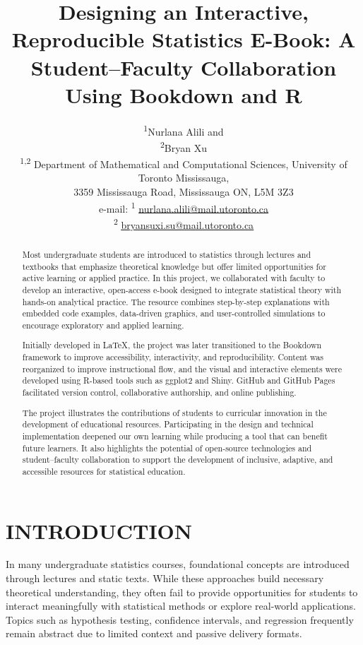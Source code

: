 \documentclass[11pt]{article}
\title{Designing an Interactive, Reproducible Statistics E-Book: A Student–Faculty Collaboration Using Bookdown and R}
\author{%
    \begin{tabular}{c}
        \textsuperscript{1}Nurlana Alili and\\
        \textsuperscript{2}Bryan Xu \\[6pt]
        \textsuperscript{1,2} Department of Mathematical and Computational Sciences, University of Toronto Mississauga, \\ 
        3359 Mississauga Road, Mississauga ON, L5M 3Z3\\[6pt]
        e-mail: \textsuperscript{1} \href{mailto:nurlana.alili@mail.utoronto.ca}{\uline{nurlana.alili@mail.utoronto.ca}}\\
        \textsuperscript{2} \href{mailto:bryansuxi.su@mail.utoronto.ca}{\uline{bryansuxi.su@mail.utoronto.ca}}
    \end{tabular}%
}
\date{}
\begin{document}
\maketitle

\begin{abstract}
Most undergraduate students are introduced to statistics through lectures and textbooks that emphasize theoretical knowledge but offer limited opportunities for active learning or applied practice. In this project, we collaborated with faculty to develop an interactive, open-access e-book designed to integrate statistical theory with hands-on analytical practice. The resource combines step-by-step explanations with embedded code examples, data-driven graphics, and user-controlled simulations to encourage exploratory and applied learning.

Initially developed in LaTeX, the project was later transitioned to the Bookdown framework to improve accessibility, interactivity, and reproducibility. Content was reorganized to improve instructional flow, and the visual and interactive elements were developed using R-based tools such as ggplot2 and Shiny. GitHub and GitHub Pages facilitated version control, collaborative authorship, and online publishing.

The project illustrates the contributions of students to curricular innovation in the development of educational resources. Participating in the design and technical implementation deepened our own learning while producing a tool that can benefit future learners. It also highlights the potential of open-source technologies and student–faculty collaboration to support the development of inclusive, adaptive, and accessible resources for statistical education.
\end{abstract}

\section{INTRODUCTION}

In many undergraduate statistics courses, foundational concepts are introduced through lectures and static texts. While these approaches build necessary theoretical understanding, they often fail to provide opportunities for students to interact meaningfully with statistical methods or explore real-world applications. Topics such as hypothesis testing, confidence intervals, and regression frequently remain abstract due to limited context and passive delivery formats.
\end{document}
